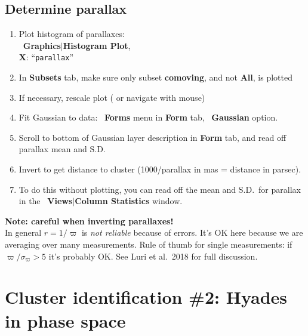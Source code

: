 \documentclass{article}
\newcommand{\buttimg}[1]
           {\mbox{\vtop{\vskip-2ex\hbox{\texttt{[image: \#1]}}}}}
\newcommand{\winfig}[2]
           {\vspace*{-0.5cm}
            \hspace*{0.5cm}\mbox{\vtop{\hbox{\texttt{[image: \#2]}}}}}
\newcommand{\lab}[1]{{\bf #1}}
\newcommand{\ma}[2]{\buttimg{#1}~\lab{#2}}
\newcommand{\mb}[3]{\buttimg{#1}~\lab{#2}$\mid$\lab{#3}}
\newcommand{\entry}[2]{\lab{#1}: ``{\tt #2}''}
\begin{document}
\subsection{Determine parallax}
\label{sec:histo-mean}

\begin{minipage}[t]{11cm}
  \raggedright
  \begin{enumerate}
  \item Plot histogram of parallaxes: \\
        \mb{histo_button.png}{Graphics}{Histogram Plot}, \\
        \entry{X}{parallax}
  \item In \lab{Subsets} tab, make sure only subset \lab{comoving},
        and not \lab{All}, is plotted
  \item If necessary, rescale plot
        (\buttimg{rescale_button.png} or navigate with mouse)
  \item Fit Gaussian to data:
        \ma{Plus1.png}{Forms} menu in \lab{Form} tab,
        \ma{ADD_FORM_GAUSSIAN}{Gaussian} option.
  \item Scroll to bottom of Gaussian layer description in \lab{Form} tab,
        and read off parallax mean and S.D.
  \item Invert to get distance to cluster
        (1000/parallax in mas = distance in parsec).
  \item To do this without plotting, you can read off the mean and S.D.\ for
        parallax in the \mb{stats_button.png}{Views}{Column Statistics} window.
  \end{enumerate}

  {\bf Note: careful when inverting parallaxes!}\\
  In general $r = 1/\varpi$ is {\em not reliable\/}
  because of errors.
  It's OK here because we are averaging over many measurements.
  Rule of thumb for single measurements:
  if $\varpi/\sigma_\varpi>5$ it's probably OK.
  See Luri et al.\ 2018 \cite{luri} for full discussion.
\end{minipage}
\begin{minipage}[t]{8cm}
  \winfig{width=8cm}{m4-parallax.png}
\end{minipage}

\newpage

\section{Cluster identification \#2: Hyades in phase space}
\end{document}

